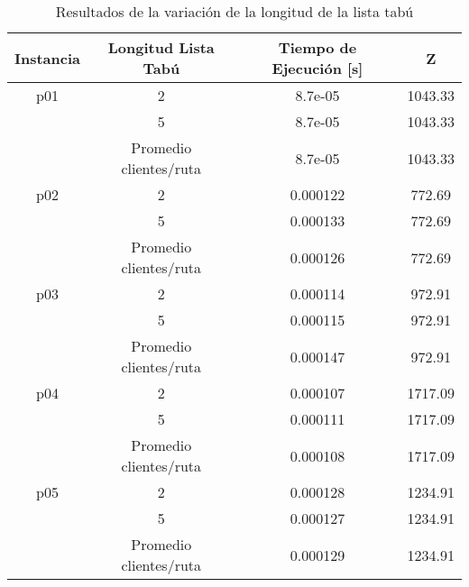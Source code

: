 \documentclass[letter, 10pt]{article}
\begin{document}
\begin{table}[H]
\centering
\begin{tabular}{|c|c|c|c|}
\hline
\textbf{Instancia} & \textbf{Longitud Lista Tabú} & \textbf{Tiempo de Ejecución [s]} & \textbf{Z} \\ \hline
p01                & 2                             & 8.7e-05                          & 1043.33   \\ \cline{2-4} 
                   & 5                             & 8.7e-05                          & 1043.33   \\ \cline{2-4} 
                   & Promedio clientes/ruta        & 8.7e-05                          & 1043.33   \\ \hline
p02                & 2                             & 0.000122                         & 772.69    \\ \cline{2-4} 
                   & 5                             & 0.000133                         & 772.69    \\ \cline{2-4} 
                   & Promedio clientes/ruta        & 0.000126                         & 772.69    \\ \hline
p03                & 2                             & 0.000114                         & 972.91    \\ \cline{2-4} 
                   & 5                             & 0.000115                         & 972.91    \\ \cline{2-4} 
                   & Promedio clientes/ruta        & 0.000147                         & 972.91    \\ \hline
p04                & 2                             & 0.000107                         & 1717.09   \\ \cline{2-4} 
                   & 5                             & 0.000111                         & 1717.09   \\ \cline{2-4} 
                   & Promedio clientes/ruta        & 0.000108                         & 1717.09   \\ \hline
p05                & 2                             & 0.000128                         & 1234.91   \\ \cline{2-4} 
                   & 5                             & 0.000127                         & 1234.91   \\ \cline{2-4} 
                   & Promedio clientes/ruta        & 0.000129                         & 1234.91   \\ \hline
\end{tabular}
\caption{Resultados de la variación de la longitud de la lista tabú}
\end{table}
\end{document}
